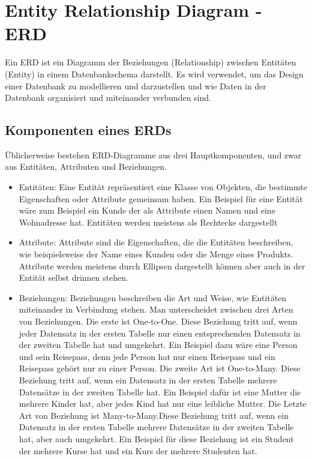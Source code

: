    \section{Entity Relationship Diagram - ERD}

    Ein ERD \cite{ERModell} ist ein Diagramm der Beziehungen (Relationship) zwischen Entitäten (Entity) in einem Datenbankschema darstellt. 
    Es wird verwendet, um das Design einer Datenbank zu modellieren und darzustellen und wie Daten in der Datenbank organisiert und miteinander verbunden sind.

    \pagebreak

    \subsection{Komponenten eines ERDs}

    Üblicherweise bestehen ERD-Diagramme aus drei Hauptkomponenten, und zwar aus Entitäten, Attributen und Beziehungen.

    \begin{itemize}
        \item Entitäten: Eine Entität repräsentiert eine Klasse von Objekten, die bestimmte Eigenschaften oder Attribute gemeinsam haben. Ein Beispiel für eine Entität wäre zum Beispiel ein Kunde der als Attribute einen Namen und eine Wohnadresse hat. Entitäten werden meistens als Rechtecke dargestellt
        \item Attribute: Attribute sind die Eigenschaften, die die Entitäten beschreiben, wie beispielsweise der Name eines Kunden oder die Menge eines Produkts. Attribute werden meistens durch Ellipsen dargestellt können aber auch in der Entität selbst drinnen stehen.
        \item Beziehungen: Beziehungen beschreiben die Art und Weise, wie Entitäten miteinander in Verbindung stehen. 
        Man unterscheidet zwischen drei Arten von Beziehungen. Die erste ist One-to-One.  Diese Beziehung tritt auf, wenn jeder Datensatz in der ersten Tabelle nur einen entsprechenden Datensatz in der zweiten Tabelle hat und umgekehrt. Ein Beispiel dazu wäre eine Person und sein Reisepass, denn jede Person hat nur einen Reisepass und ein Reisepass gehört nur zu einer Person.
        Die zweite Art ist One-to-Many. Diese Beziehung tritt auf, wenn ein Datensatz in der ersten Tabelle mehrere Datensätze in der zweiten Tabelle hat. Ein Beispiel dafür ist eine Mutter die mehrere Kinder hat, aber jedes Kind hat nur eine leibliche Mutter.
        Die Letzte Art von Beziehung ist Many-to-Many.Diese Beziehung tritt auf, wenn ein Datensatz in der ersten Tabelle mehrere Datensätze in der zweiten Tabelle hat, aber auch umgekehrt. Ein Beispiel für diese Beziehung ist ein Student der mehrere Kurse hat und ein Kurs der mehrere Studenten hat.

        \end{itemize}

